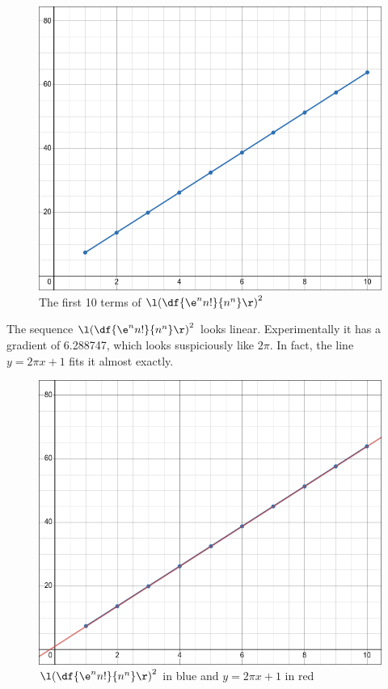 \documentclass[a4paper]{article}
\begin{document}
\begin{figure}[hbtp]
    \centering
    \includegraphics[scale=0.4]{Q4b}
    \caption{The first 10 terms of ${\l(\df{\e^n n!}{n^n}\r)}^2$}
\end{figure}

The sequence ${\l(\df{\e^n n!}{n^n}\r)}^2$ looks linear. Experimentally it has a gradient of 6.288747, which looks suspiciously like $2\pi$. In fact, the line $y = 2\pi x + 1$ fits it almost exactly.

\begin{figure}[hbtp]
    \centering
    \includegraphics[scale=0.4]{Q4c}
    \caption{${\l(\df{\e^n n!}{n^n}\r)}^2$ in blue and $y = 2\pi x + 1$ in red}
\end{figure}
\end{document}
